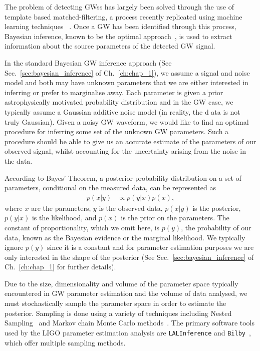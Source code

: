 The problem of detecting \acp{GW}s has largely been solved through the 
use of template based matched-filtering, a process recently 
replicated using machine learning
techniques
~\cite{GEORGE201864,PhysRevLett.120.141103,
GebKilParHarSch,2021arXiv210403961Y}. Once a \ac{GW} has been 
identified through this process, Bayesian inference, known 
to be the optimal approach~\cite{2009CQGra..26o5017S}, is used to 
extract information about the source parameters of the detected \ac{GW} signal.

%
%
In the standard Bayesian \ac{GW} inference approach (See 
Sec.~\ref{sec:bayesian_inference} of 
Ch.~\ref{ch:chap_1}), we assume a 
signal and noise model and both may have unknown parameters that we 
are either interested in inferring or prefer to marginalise away. Each 
parameter is given a prior astrophysically motivated probability 
distribution and in the \ac{GW} case, we
typically assume a Gaussian additive noise model (in reality, the d
ata is not truly Gaussian). Given a noisy \ac{GW} waveform, 
we would like to find an optimal procedure for inferring 
some set of the unknown \ac{GW} parameters. Such a procedure 
should be able to give us an accurate estimate of the parameters 
of our observed signal, whilst accounting for the uncertainty 
arising from the noise in the data.

%
%
According to Bayes' Theorem, a posterior probability distribution on a set of parameters, conditional on the measured data, can be represented as
%
\begin{align}\label{eq:bayes_theorem} 
p(x|y) &\propto p(y|x) p(x), 
\end{align}
%
where $x$ are the parameters, $y$ is the observed data, 
$p(x|y)$ is the posterior, $p(y|x)$ is 
the likelihood, and $p(x)$ is the prior on the parameters. The 
constant of proportionality, which we omit here, is $p(y)$, the 
probability of our data, known as the Bayesian evidence or the 
marginal likelihood. We typically ignore $p(y)$ since it is a constant 
and for parameter estimation purposes we are only interested in the 
shape of the posterior (See Sec.~\ref{sec:bayesian_inference} of 
Ch.~\ref{ch:chap_1} for further details).

%
%
Due to the size, dimensionality and volume of the parameter 
space typically encountered in \ac{GW} parameter estimation and the 
volume of data analysed, we must stochastically sample the 
parameter space in order to estimate the posterior. Sampling is 
done using a variety of techniques including Nested
Sampling~\cite{skilling2006,cpnest,dynesty} and Markov chain 
Monte Carlo methods~\cite{emcee,ptemcee}. The primary software 
tools used by the \ac{LIGO} parameter estimation analysis 
are \texttt{LALInference} and
\texttt{Bilby}~\cite{1409.7215,1811.02042}, which offer 
multiple sampling methods.  
  
